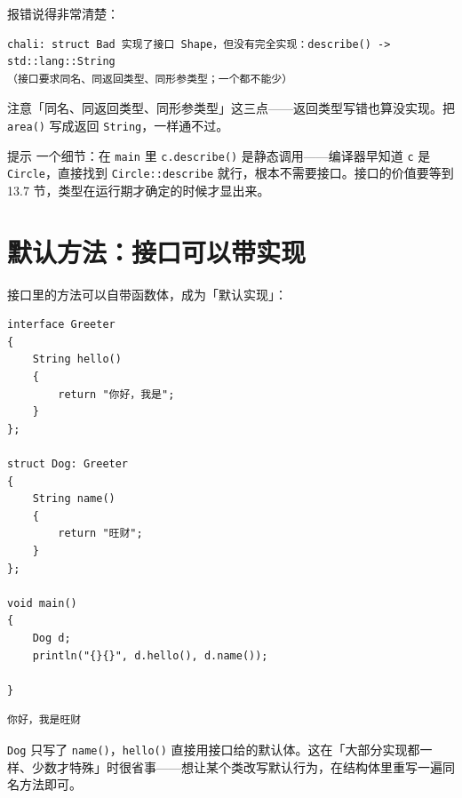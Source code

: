 报错说得非常清楚：

\par
\medskip
\begin{lstlisting}[style=out]
chali: struct Bad 实现了接口 Shape，但没有完全实现：describe() -> std::lang::String
（接口要求同名、同返回类型、同形参类型；一个都不能少）
\end{lstlisting}
\par
\medskip

注意「同名、同返回类型、同形参类型」这三点——返回类型写错也算没实现。把 \texttt{area(\allowbreak{})\allowbreak{}} 写成返回 \texttt{String}，一样通不过。

\begin{tip}{提示}
一个细节：在 \texttt{main} 里 \texttt{c.\allowbreak{}describe(\allowbreak{})\allowbreak{}} 是静态调用——编译器早知道 \texttt{c} 是\texttt{Circle}，直接找到 \texttt{Circle:\allowbreak{}:\allowbreak{}describe} 就行，根本不需要接口。接口的价值要等到13.7 节，类型在运行期才确定的时候才显出来。
\end{tip}

\section{默认方法：接口可以带实现}

接口里的方法可以自带函数体，成为「默认实现」：

\par
\medskip
\begin{lstlisting}[style=chali]
interface Greeter
{
    String hello()
    {
        return "你好，我是";
    }
};

struct Dog: Greeter
{
    String name()
    {
        return "旺财";
    }
};

void main()
{
    Dog d;
    println("{}{}", d.hello(), d.name());

}
\end{lstlisting}
\par
\medskip

\par
\medskip
\begin{lstlisting}[style=out]
你好，我是旺财
\end{lstlisting}
\par
\medskip

\texttt{Dog} 只写了 \texttt{name(\allowbreak{})\allowbreak{}}，\texttt{hello(\allowbreak{})\allowbreak{}} 直接用接口给的默认体。这在「大部分实现都一样、少数才特殊」时很省事——想让某个类改写默认行为，在结构体里重写一遍同名方法即可。

